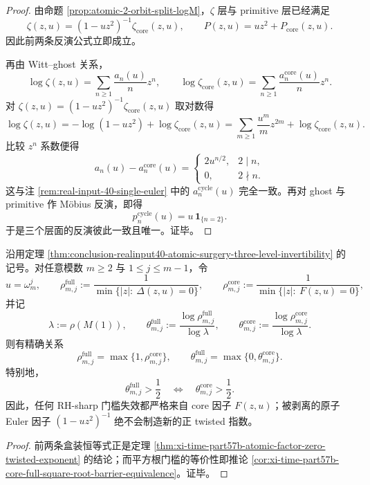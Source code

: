 \begin{proof}
由命题 \ref{prop:atomic-2-orbit-split-logM}，\(\zeta\) 层与 primitive 层已经满足
\[
\zeta(z,u)=(1-uz^2)^{-1}\zeta_{\mathrm{core}}(z,u),
\qquad
P(z,u)=uz^2+P_{\mathrm{core}}(z,u).
\]
因此前两条反演公式立即成立。

再由 Witt--ghost 关系，
\[
\log \zeta(z,u)=\sum_{n\ge 1}\frac{a_n(u)}{n}z^n,
\qquad
\log \zeta_{\mathrm{core}}(z,u)=\sum_{n\ge 1}\frac{a_n^{\mathrm{core}}(u)}{n}z^n.
\]
对
\(
\zeta(z,u)=(1-uz^2)^{-1}\zeta_{\mathrm{core}}(z,u)
\)
取对数得
\[
\log \zeta(z,u)
=
-\log(1-uz^2)+\log \zeta_{\mathrm{core}}(z,u)
=
\sum_{m\ge 1}\frac{u^m}{m}z^{2m}
+\log \zeta_{\mathrm{core}}(z,u).
\]
比较 \(z^n\) 系数便得
\[
a_n(u)-a_n^{\mathrm{core}}(u)=
\begin{cases}
2u^{n/2},&2\mid n,\\
0,&2\nmid n.
\end{cases}
\]
这与注 \ref{rem:real-input-40-single-euler} 中的 \(a_n^{\mathrm{cycle}}(u)\) 完全一致。再对 ghost 与 primitive 作 Möbius 反演，即得
\[
p_n^{\mathrm{cycle}}(u)=u\,\mathbf 1_{\{n=2\}}.
\]
于是三个层面的反演彼此一致且唯一。证毕。
\end{proof}

\begin{corollary}\label{cor:conclusion-realinput40-core-orthogonal-twisted-exponent}
沿用定理 \ref{thm:conclusion-realinput40-atomic-surgery-three-level-invertibility} 的记号。对任意模数 \(m\ge 2\) 与 \(1\le j\le m-1\)，令
\[
u=\omega_m^j,\qquad
\rho_{m,j}^{\mathrm{full}}
:=
\frac{1}{\min\{|z|:\ \Delta(z,u)=0\}},
\qquad
\rho_{m,j}^{\mathrm{core}}
:=
\frac{1}{\min\{|z|:\ F(z,u)=0\}},
\]
并记
\[
\lambda:=\rho(M(1)),\qquad
\theta_{m,j}^{\mathrm{full}}
:=
\frac{\log \rho_{m,j}^{\mathrm{full}}}{\log \lambda},
\qquad
\theta_{m,j}^{\mathrm{core}}
:=
\frac{\log \rho_{m,j}^{\mathrm{core}}}{\log \lambda}.
\]
则有精确关系
\[
\boxed{\;
\rho_{m,j}^{\mathrm{full}}=\max\{1,\rho_{m,j}^{\mathrm{core}}\},\qquad
\theta_{m,j}^{\mathrm{full}}=\max\{0,\theta_{m,j}^{\mathrm{core}}\}.\;}
\]
特别地，
\[
\theta_{m,j}^{\mathrm{full}}>\frac12
\quad\Longleftrightarrow\quad
\theta_{m,j}^{\mathrm{core}}>\frac12.
\]
因此，任何 RH-sharp 门槛失效都严格来自 core 因子 \(F(z,u)\)；被剥离的原子 Euler 因子 \((1-uz^2)^{-1}\) 绝不会制造新的正 twisted 指数。
\end{corollary}
\begin{proof}
前两条盒装恒等式正是定理 \ref{thm:xi-time-part57b-atomic-factor-zero-twisted-exponent} 的结论；而平方根门槛的等价性即推论 \ref{cor:xi-time-part57b-core-full-square-root-barrier-equivalence}。证毕。
\end{proof}

